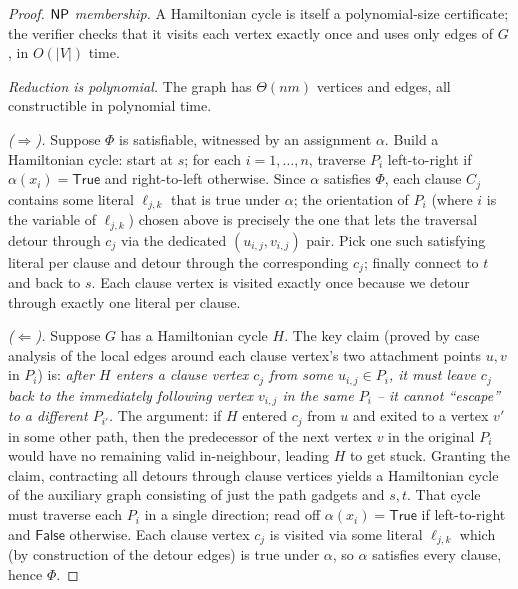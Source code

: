 \begin{proof}
\sketchproof
\textit{$\mathsf{NP}$ membership.} A Hamiltonian cycle is itself a polynomial-size certificate; the verifier checks that it visits each vertex exactly once and uses only edges of $G$, in $O(|V|)$ time.

\medskip
\noindent\textit{Reduction is polynomial.} The graph has $\Theta(nm)$ vertices and edges, all constructible in polynomial time.

\medskip
\noindent\textit{($\Rightarrow$).} Suppose $\Phi$ is satisfiable, witnessed by an assignment $\alpha$. Build a Hamiltonian cycle: start at $s$; for each $i = 1, \dots, n$, traverse $P_i$ left-to-right if $\alpha(x_i) = \mathsf{True}$ and right-to-left otherwise. Since $\alpha$ satisfies $\Phi$, each clause $C_j$ contains some literal $\ell_{j,k}$ that is true under $\alpha$; the orientation of $P_i$ (where $i$ is the variable of $\ell_{j,k}$) chosen above is precisely the one that lets the traversal detour through $c_j$ via the dedicated $(u_{i,j}, v_{i,j})$ pair. Pick one such satisfying literal per clause and detour through the corresponding $c_j$; finally connect to $t$ and back to $s$. Each clause vertex is visited exactly once because we detour through exactly one literal per clause.

\medskip
\noindent\textit{($\Leftarrow$).} Suppose $G$ has a Hamiltonian cycle $H$. The key claim (proved by case analysis of the local edges around each clause vertex's two attachment points $u, v$ in $P_i$) is: \emph{after $H$ enters a clause vertex $c_j$ from some $u_{i,j} \in P_i$, it must leave $c_j$ back to the immediately following vertex $v_{i,j}$ in the same $P_i$ -- it cannot ``escape'' to a different $P_{i'}$.} The argument: if $H$ entered $c_j$ from $u$ and exited to a vertex $v'$ in some other path, then the predecessor of the next vertex $v$ in the original $P_i$ would have no remaining valid in-neighbour, leading $H$ to get stuck. Granting the claim, contracting all detours through clause vertices yields a Hamiltonian cycle of the auxiliary graph consisting of just the path gadgets and $s, t$. That cycle must traverse each $P_i$ in a single direction; read off $\alpha(x_i) = \mathsf{True}$ if left-to-right and $\mathsf{False}$ otherwise. Each clause vertex $c_j$ is visited via some literal $\ell_{j,k}$ which (by construction of the detour edges) is true under $\alpha$, so $\alpha$ satisfies every clause, hence $\Phi$.
\end{proof}

